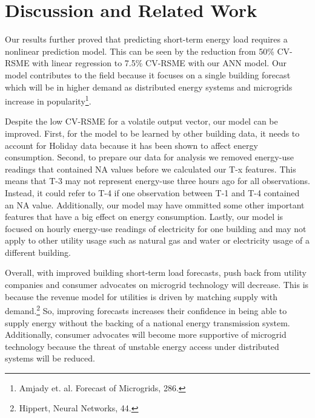 \documentclass[twoside,11pt]{article}
\begin{document}
\section{Discussion and Related Work} 

Our results further proved that predicting short-term energy load requires a nonlinear prediction model. This can be seen by the reduction from 50\% CV-RSME with linear regression to 7.5\% CV-RSME with our ANN model. Our model contributes to the field because it focuses on a single building forecast which will be in higher demand as distributed energy systems and microgrids increase in popularity\footnote{Amjady et. al. Forecast of Microgrids, 286.}. 

Despite the low CV-RSME for a volatile output vector, our model can be improved. First, for the model to be learned by other building data, it needs to account for Holiday data because it has been shown to affect energy consumption. Second, to prepare our data for analysis we removed energy-use readings that contained NA values before we calculated our T-x features. This means that T-3 may not represent energy-use three hours ago for all observations. Instead, it could refer to T-4 if one observation between T-1 and T-4 contained an NA value. Additionally, our model may have ommitted some other important features that have a big effect on energy consumption. Lastly, our model is focused on hourly energy-use readings of electricity for one building and may not apply to other utility usage such as natural gas and water or electricity usage of a different building. 

Overall, with improved building short-term load forecasts, push back from utility companies and consumer advocates on microgrid technology will decrease. This is because the revenue model for utilities is driven by matching supply with demand.\footnote{Hippert, Neural Networks, 44.} So, improving forecasts increases their confidence in being able to supply energy without the backing of a national energy transmission system. Additionally, consumer advocates will become more supportive of microgrid technology because the threat of unstable energy access under distributed systems will be reduced. 
\end{document}
